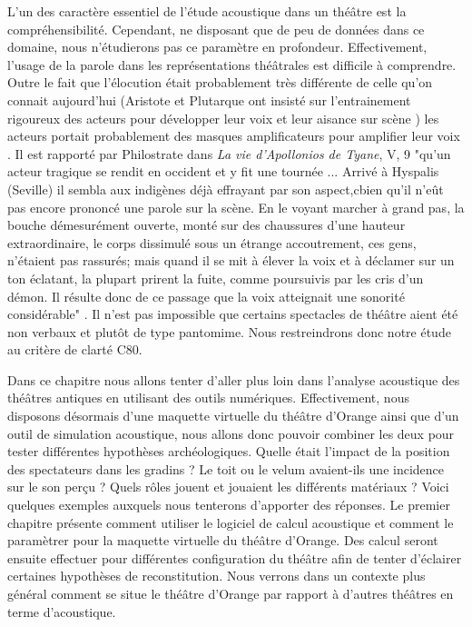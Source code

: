 L'un des caractère essentiel de l'étude acoustique dans un théâtre est la compréhensibilité. Cependant, ne disposant que de peu de données dans ce domaine, nous n'étudierons pas ce paramètre en profondeur. Effectivement, l'usage de la parole dans les représentations théâtrales est difficile à comprendre. Outre le fait que l'élocution était probablement très différente de celle qu'on connait aujourd'hui (Aristote \cite[Chap IV - XIV]{aristote} et Plutarque ont insisté sur l'entrainement rigoureux des acteurs pour développer leur voix et leur aisance sur scène \cite[p.39]{canac}) les acteurs portait probablement des masques amplificateurs pour amplifier leur voix \cite[p.362]{arnaud}. Il est rapporté par Philostrate dans \textit{La vie d'Apollonios de Tyane}, V, 9 "qu'un acteur tragique se rendit en occident et y fit une tournée ... Arrivé à Hyspalis (Seville) il sembla aux indigènes déjà effrayant par son aspect,cbien qu'il n'eût pas encore prononcé une parole sur la scène. En le voyant marcher à grand pas, la bouche démesurément ouverte, monté sur des chaussures d'une hauteur extraordinaire, le corps dissimulé sous un étrange accoutrement, ces gens, n'étaient pas rassurés; mais quand il se mit à élever la voix et à déclamer sur un ton éclatant, la plupart prirent la fuite, comme poursuivis par les cris d'un démon. Il résulte donc de ce passage que la voix atteignait une sonorité considérable" \cite[p.43]{formige}. Il n'est pas impossible que certains spectacles de théâtre aient été non verbaux et plutôt de type pantomime. Nous restreindrons donc notre étude au critère de clarté \gls{C80}.

Dans ce chapitre nous allons tenter d'aller plus loin dans l'analyse acoustique des théâtres antiques en utilisant des outils numériques. Effectivement, nous disposons désormais d'une maquette virtuelle du théâtre d'Orange ainsi que d'un outil de simulation acoustique, nous allons donc pouvoir combiner les deux pour tester différentes hypothèses archéologiques. Quelle était l'impact de la position des spectateurs dans les gradins ? Le toit ou le \gls{velum} avaient-ils une incidence sur le son perçu ? Quels rôles jouent et jouaient les différents matériaux ? Voici quelques exemples auxquels nous tenterons d'apporter des réponses. Le premier chapitre présente comment utiliser le logiciel de calcul acoustique et comment le paramètrer pour la maquette virtuelle du théâtre d'Orange. Des calcul seront ensuite effectuer pour différentes configuration du théâtre afin de tenter d'éclairer certaines hypothèses de reconstitution. Nous verrons dans un contexte plus général comment se situe le théâtre d'Orange par rapport à d'autres théâtres en terme d'acoustique.	
	

